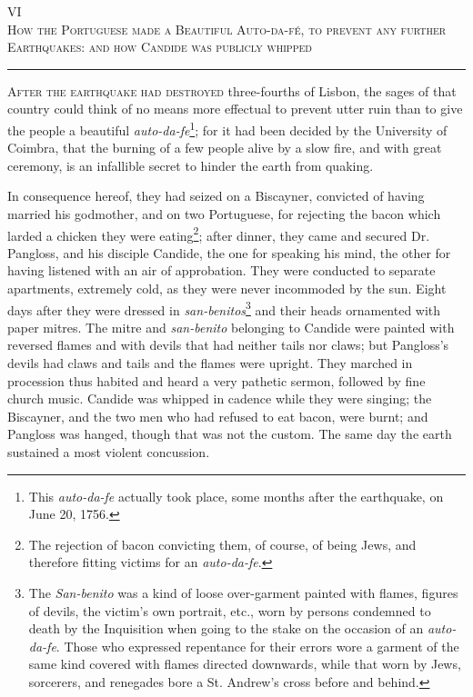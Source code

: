 \begin{center}
VI\\
\textsc{How the Portuguese made a Beautiful Auto-da-fé, to prevent any further Earthquakes: and how Candide was publicly whipped}
\end{center}
\vspace{-0.5cm}
\rule{\textwidth}{0.5pt}
\lettrine{A}{fter the earthquake had destroyed} three-fourths of Lisbon, the sages of that country could think of no means more effectual to prevent utter ruin than to give the people a beautiful \textit{auto-da-fe}\footnote{This \textit{auto-da-fe} actually took place, some months after the earthquake, on June 20, 1756.}; for it had been decided by the University of Coimbra, that the burning of a few people alive by a slow fire, and with great ceremony, is an infallible secret to hinder the earth from quaking.

In consequence hereof, they had seized on a Biscayner, convicted of having married his godmother, and on two Portuguese, for rejecting the bacon which larded a chicken they were eating\footnote{The rejection of bacon convicting them, of course, of being Jews, and therefore fitting victims for an \textit{auto-da-fe}.}; after dinner, they came and secured Dr. Pangloss, and his disciple Candide, the one for speaking his mind, the other for having listened with an air of approbation. They were conducted to separate apartments, extremely cold, as they were never incommoded by the sun. Eight days after they were dressed in \textit{san-benitos}\footnote{The \textit{San-benito} was a kind of loose over-garment painted with flames, figures of devils, the victim's own portrait, etc., worn by persons condemned to death by the Inquisition when going to the stake on the occasion of an \textit{auto-da-fe}. Those who expressed repentance for their errors wore a garment of the same kind covered with flames directed downwards, while that worn by Jews, sorcerers, and renegades bore a St. Andrew's cross before and behind.} and their heads ornamented with paper mitres. The mitre and \textit{san-benito} belonging to Candide were painted with reversed flames and with devils that had neither tails nor claws; but Pangloss's devils had claws and tails and the flames were upright. They marched in procession thus habited and heard a very pathetic sermon, followed by fine church music. Candide was whipped in cadence while they were singing; the Biscayner, and the two men who had refused to eat bacon, were burnt; and Pangloss was hanged, though that was not the custom. The same day the earth sustained a most violent concussion.

